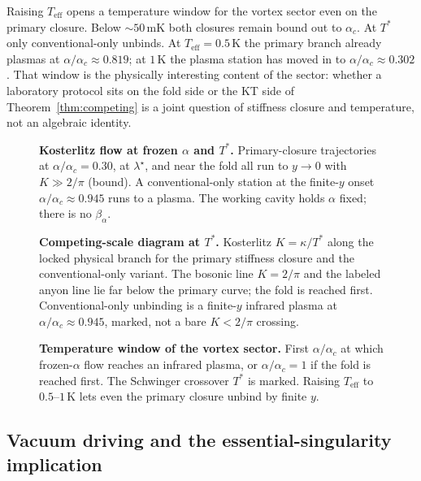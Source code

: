 Raising $T_{\mathrm{eff}}$ opens a temperature window for the vortex sector even on the primary closure. Below $\sim 50$\,mK both closures remain bound out to $\alpha_c$. At $T^*$ only conventional-only unbinds. At $T_{\mathrm{eff}}=0.5$\,K the primary branch already plasmas at $\alpha/\alpha_c\approx 0.819$; at $1$\,K the plasma station has moved in to $\alpha/\alpha_c\approx 0.302$. That window is the physically interesting content of the sector: whether a laboratory protocol sits on the fold side or the KT side of Theorem~\ref{thm:competing} is a joint question of stiffness closure and temperature, not an algebraic identity.

\begin{figure}[htbp]
\centering

\caption{\textbf{Kosterlitz flow at frozen $\alpha$ and $T^*$.} Primary-closure trajectories at $\alpha/\alpha_c=0.30$, at $\lambda^\star$, and near the fold all run to $y\to 0$ with $K\gg 2/\pi$ (bound). A conventional-only station at the finite-$y$ onset $\alpha/\alpha_c\approx 0.945$ runs to a plasma. The working cavity holds $\alpha$ fixed; there is no $\beta_\alpha$.}
\label{fig:vrg_flow}
\end{figure}

\begin{figure}[htbp]
\centering

\caption{\textbf{Competing-scale diagram at $T^*$.} Kosterlitz $K=\kappa/T^*$ along the locked physical branch for the primary stiffness closure and the conventional-only variant. The bosonic line $K=2/\pi$ and the labeled anyon line lie far below the primary curve; the fold is reached first. Conventional-only unbinding is a finite-$y$ infrared plasma at $\alpha/\alpha_c\approx 0.945$, marked, not a bare $K<2/\pi$ crossing.}
\label{fig:competing_scales}
\end{figure}

\begin{figure}[htbp]
\centering

\caption{\textbf{Temperature window of the vortex sector.} First $\alpha/\alpha_c$ at which frozen-$\alpha$ flow reaches an infrared plasma, or $\alpha/\alpha_c=1$ if the fold is reached first. The Schwinger crossover $T^*$ is marked. Raising $T_{\mathrm{eff}}$ to $0.5$--$1$\,K lets even the primary closure unbind by finite $y$.}
\label{fig:teff_window}
\end{figure}

\subsection{Vacuum driving and the essential-singularity implication}
\label{sec:unbinding_mech}

